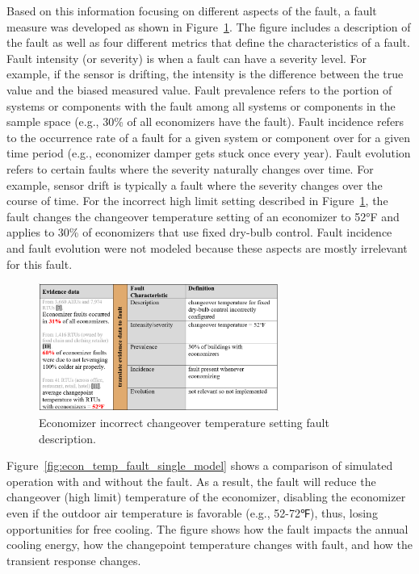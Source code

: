 Based on this information focusing on different aspects of the fault, a fault measure was developed as shown in Figure~\ref{fig:econ_temp_fault}. The figure includes a description of the fault as well as four different metrics that define the characteristics of a fault. Fault intensity (or severity) is when a fault can have a severity level. For example, if the sensor is drifting, the intensity is the difference between the true value and the biased measured value. Fault prevalence refers to the portion of systems or components with the fault among all systems or components in the sample space (e.g., 30\% of all economizers have the fault). Fault incidence refers to the occurrence rate of a fault for a given system or component over for a given time period (e.g., economizer damper gets stuck once every year). Fault evolution refers to certain faults where the severity naturally changes over time. For example, sensor drift is typically a fault where the severity changes over the course of time. For the incorrect high limit setting described in Figure~\ref{fig:econ_temp_fault}, the fault changes the changeover temperature setting of an economizer to 52°F and applies to 30\% of economizers that use fixed dry-bulb control. Fault incidence and fault evolution were not modeled because these aspects are mostly irrelevant for this fault.

\begin{figure}
  \centering \includegraphics[width=0.7\textwidth]{figures/econ_temp_fault.png}
  \caption{Economizer incorrect changeover temperature setting fault description.}
  \label{fig:econ_temp_fault}
\end{figure}

Figure~\ref{fig:econ_temp_fault_single_model} shows a comparison of simulated operation with and without the fault. As a result, the fault will reduce the changeover (high limit) temperature of the economizer, disabling the economizer even if the outdoor air temperature is favorable (e.g., 52-72℉), thus, losing opportunities for free cooling. The figure shows how the fault impacts the annual cooling energy, how the changepoint temperature changes with fault, and how the transient response changes.

